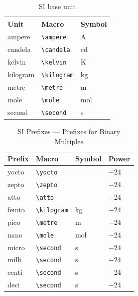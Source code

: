 \documentclass[a4paper,UTF8]{article}
\theoremstyle{mystyle}{
  \newtheorem{law}{Law}
}
\begin{document}
\begin{table}[htbp]
\caption{SI base unit}
\centering

\begin{tabular}{lll}
\hline									
Unit	   	&	Macro		 	& 	Symbol			\\
\hline
ampere	 	& \verb|\ampere|	& \si{\ampere}		\\
candela		& \verb|\candela|	& \si{\candela}		\\
kelvin 		& \verb|\kelvin|	& \si{\kelvin}		\\
kilogram 	& \verb|\kilogram| 	& \si{\kilogram}	\\
metre 		& \verb|\metre| 	& \si{\metre}		\\
mole 		& \verb|\mole| 		& \si{\mole}		\\
second 		& \verb|\second| 	& \si{\second}		\\
\hline
\end{tabular}
\end{table}




\begin{table}[htbp]
\caption{SI Prefixes --- Prefixes for Binary Multiples}
\centering

\begin{tabular}{llll}
\hline									
Prefix	   	&	Macro		 	& 	Symbol			& Power\\
\hline
yocto	 	& \verb|\yocto|		& \si{\yocto}		& \num{-24}		\\
zepto		& \verb|\zepto|	& \si{\zepto}		& \num{-24}	\\
atto 		& \verb|\atto|	& \si{\atto}		& \num{-24} \\
femto 		& \verb|\kilogram| 	& \si{\kilogram}	& \num{-24}\\
pico 		& \verb|\metre| 	& \si{\metre}		& \num{-24}\\
nano 		& \verb|\mole| 		& \si{\mole}		& \num{-24}\\
micro 		& \verb|\second| 	& \si{\second}		& \num{-24}\\
milli		& \verb|\second| 	& \si{\second}		& \num{-24}\\
centi		& \verb|\second| 	& \si{\second}		& \num{-24}\\
deci		& \verb|\second| 	& \si{\second}		& \num{-24}\\
\hline
\end{tabular}
\end{table}
\end{document}
